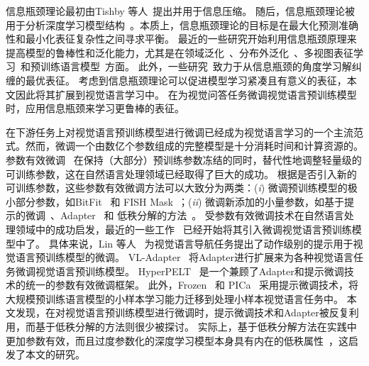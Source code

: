 信息瓶颈理论最初由Tishby 等人~\cite{tishby2000information}提出并用于信息压缩。
随后，信息瓶颈理论被用于分析深度学习模型结构~\cite{tishby2015deep,shwartz2017opening}。本质上，信息瓶颈理论的目标是在最大化预测准确性和最小化表征复杂性之间寻求平衡。
最近的一些研究开始利用信息瓶颈原理来提高模型的鲁棒性和泛化能力，尤其是在领域泛化~\cite{du2020learning,li2022invariant}、分布外泛化~\cite{ahuja2021invariance}、多视图表征学习~\cite{federici2020learning,bao2021disentangled}和预训练语言模型~\cite{mahabadi2021variational,wang2021infobert}方面。
此外，一些研究~\cite{dubois2020learning,pan2020disentangled,jeon2021ib}致力于从信息瓶颈的角度学习解纠缠的最优表征。
考虑到信息瓶颈理论可以促进模型学习紧凑且有意义的表征，本文因此将其扩展到视觉语言学习中。
在为视觉问答任务微调视觉语言预训练模型时，应用信息瓶颈来学习更鲁棒的表征。




在下游任务上对视觉语言预训练模型进行微调已经成为视觉语言学习的一个主流范式。然而，微调一个由数亿个参数组成的完整模型是十分消耗时间和计算资源的。
参数有效微调~\cite{mahabadi2021parameter,yang2022prompt,ruckle2021adapterdrop,mao2022unipelt,he2022towards,yang2022robust,zhang2022differentiable} 在保持（大部分）预训练参数冻结的同时，替代性地调整轻量级的可训练参数，这在自然语言处理领域已经取得了巨大的成功。
根据是否引入新的可训练参数，这些参数有效微调方法可以大致分为两类：(\emph{i}) 微调预训练模型的极小部分参数，如BitFit~\cite{zaken2022bitfit} 和 FISH Mask~\cite{sung2021training}；(\emph{ii}) 微调新添加的小量参数，如基于提示的微调~\cite{lester2021power,li2021prefix}、Adapter~\cite{houlsby2019parameter,pfeiffer2020adapterfusion} 和 低秩分解的方法~\cite{karimi2021compacter,hu2022lora}。
受参数有效微调技术在自然语言处理领域中的成功启发，最近的一些工作~\cite{lin2022adapt,zhang2022hyperpelt,sung2022vl} 已经开始将其引入微调视觉语言预训练模型中了。
具体来说，Lin 等人~\cite{lin2022adapt} 为视觉语言导航任务提出了动作级别的提示用于视觉语言预训练模型的微调。
VL-Adapter~\cite{sung2022vl} 将Adapter进行扩展来为各种视觉语言任务微调视觉语言预训练模型。
HyperPELT~\cite{zhang2022hyperpelt} 是一个兼顾了Adapter和提示微调技术的统一的参数有效微调框架。
此外，Frozen~\cite{tsimpoukelli2021multimodal} 和 PICa~\cite{yang2022empirical} 采用提示微调技术，将大规模预训练语言模型的小样本学习能力迁移到处理小样本视觉语言任务中。
本文发现，在对视觉语言预训练模型进行微调时，提示微调技术和Adapter被反复利用，而基于低秩分解的方法则很少被探讨。
实际上，基于低秩分解方法在实践中更加参数有效，而且过度参数化的深度学习模型本身具有内在的低秩属性~\cite{oymak2019generalization,aghajanyan2021intrinsic,li2022parameter}，这启发了本文的研究。

